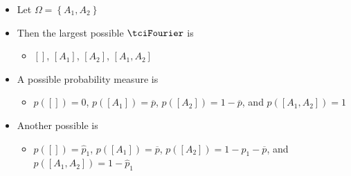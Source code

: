 \documentclass[notes=show]{beamer}
\begin{document}
\begin{frame}%


\begin{itemize}
\item Let $\Omega =\left\{ A_{1},A_{2}\right\} $

\item Then the largest possible $\tciFourier $ is

\begin{itemize}
\item $[]$, $[A_{1}]$, $[A_{2}]$, $[A_{1},A_{2}]$
\end{itemize}

\item A possible probability measure is

\begin{itemize}
\item $p\left( []\right) =0$, $p\left( [A_{1}]\right) =\overline{p}$, $%
p\left( [A_{2}]\right) =1-\overline{p}$, and $p\left( [A_{1},A_{2}]\right)
=1 $
\end{itemize}

\item Another possible is

\begin{itemize}
\item $p\left( []\right) =\widehat{p}_{1}$, $p\left( [A_{1}]\right) =%
\overline{p}$, $p\left( [A_{2}]\right) =1-\widehat{p}_{1}-\overline{p}$, and 
$p\left( [A_{1},A_{2}]\right) =1-\widehat{p}_{1}$
\end{itemize}
\end{itemize}

\end{frame}%
\end{document}
